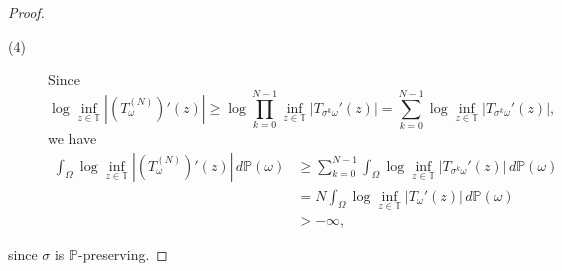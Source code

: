 \documentclass[10pt,a4paper]{amsart}
\begin{document}
\begin{proof}
\begin{description}
    \item[(4)] Since $$\log\inf_{z\in\mathbb{T}}|(T_{\omega}^{(N)})'(z)|\ge\log\prod_{k=0}^{N-1}\inf_{z\in\mathbb{T}}|T_{\sigma^{k}\omega}'(z)|=\sum_{k=0}^{N-1}\log\inf_{z\in\mathbb{T}}|T_{\sigma^{k}\omega}'(z)|,$$ we have \begin{align*}\int_{\Omega}\log\inf_{z\in\mathbb{T}}|(T_{\omega}^{(N)})'(z)|\,d\mathbb{P}(\omega)&\ge\sum_{k=0}^{N-1}\int_{\Omega}\log\inf_{z\in\mathbb{T}}|T_{\sigma^{k}\omega}'(z)|\,d\mathbb{P}(\omega)\\&=N\int_{\Omega}\log\inf_{z\in\mathbb{T}}|T_{\omega}'(z)|\,d\mathbb{P}(\omega)\\&>-\infty,\end{align*}\end{description} since $\sigma$ is $\mathbb{P}$-preserving.\end{proof}
\end{document}
